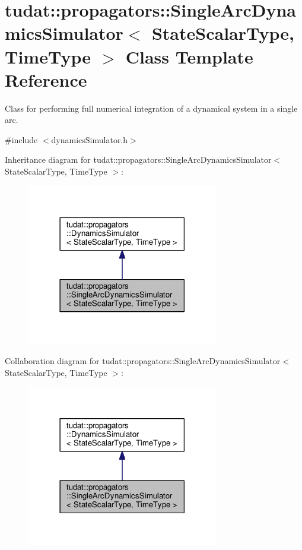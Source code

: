 \hypertarget{classtudat_1_1propagators_1_1SingleArcDynamicsSimulator}{}\section{tudat\+:\+:propagators\+:\+:Single\+Arc\+Dynamics\+Simulator$<$ State\+Scalar\+Type, Time\+Type $>$ Class Template Reference}
\label{classtudat_1_1propagators_1_1SingleArcDynamicsSimulator}


Class for performing full numerical integration of a dynamical system in a single arc.  




{\ttfamily \#include $<$dynamics\+Simulator.\+h$>$}



Inheritance diagram for tudat\+:\+:propagators\+:\+:Single\+Arc\+Dynamics\+Simulator$<$ State\+Scalar\+Type, Time\+Type $>$\+:
\nopagebreak
\begin{figure}[H]
\begin{center}
\leavevmode
\includegraphics[width=237pt]{classtudat_1_1propagators_1_1SingleArcDynamicsSimulator__inherit__graph}
\end{center}
\end{figure}


Collaboration diagram for tudat\+:\+:propagators\+:\+:Single\+Arc\+Dynamics\+Simulator$<$ State\+Scalar\+Type, Time\+Type $>$\+:
\nopagebreak
\begin{figure}[H]
\begin{center}
\leavevmode
\includegraphics[width=237pt]{classtudat_1_1propagators_1_1SingleArcDynamicsSimulator__coll__graph}
\end{center}
\end{figure}
